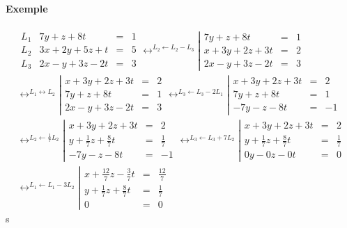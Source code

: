 \paragraph{Exemple}
\begin{eqnarray*}
  \begin{array}{lrcl}
    L_1 & 7 y + z + 8 t & = & 1 \\
    L_2 & 3 x + 2 y + 5 z + t & = & 5 \\
    L_3 & 2 x - y + 3 z - 2 t & = & 3
  \end{array}
  \leftrightarrow^{L_2 \leftarrow L_2 - L_3}
  \left\vert \begin{array}{rcl}
    7 y + z + 8 t & = & 1 \\
    x + 3 y + 2 z + 3 t & = & 2 \\
    2 x - y + 3 z - 2 t & = & 3
  \end{array} \right. \\
  
  \leftrightarrow^{L_1 \leftrightarrow L_2}
  \left\vert \begin{array}{rcl}
    x + 3 y + 2 z + 3 t & = & 2 \\
    7 y + z + 8 t & = & 1 \\
    2 x - y + 3 z - 2 t & = & 3
  \end{array} \right.
  \leftrightarrow^{L_3 \leftarrow L_3 - 2 L_1}
  \left\vert \begin{array}{rcl}
    x + 3 y + 2 z + 3 t & = & 2 \\
    7 y + z + 8 t & = & 1 \\
    -7 y - z - 8 t & = & -1
  \end{array} \right. \\
  
  \leftrightarrow^{L_2 \leftarrow \frac{1}{7} L_2}
  \left\vert \begin{array}{rcl}
    x + 3 y + 2 z + 3 t & = & 2 \\
    y + \frac{1}{7} z + \frac{8}{7} t & = & \frac{1}{7} \\
    -7 y - z - 8 t & = & -1
  \end{array} \right. 
  \leftrightarrow^{L_3 \leftarrow L_3 + 7 L_2}
  \left\vert \begin{array}{rcl}
    x + 3 y + 2 z + 3 t & = & 2 \\
    y + \frac{1}{7} z + \frac{8}{7} t & = & \frac{1}{7} \\
    0 y - 0 z - 0 t & = & 0
  \end{array} \right. \\
  
  \leftrightarrow^{L_1 \leftarrow L_1 - 3 L_2}
  \left\vert \begin{array}{rcl}
    x + \frac{12}{7} z - \frac{3}{7} t & = & \frac{12}{7} \\
    y + \frac{1}{7} z + \frac{8}{7} t & = & \frac{1}{7} \\
    0 & = & 0
  \end{array} \right.
\end{eqnarray*}s
%
%
